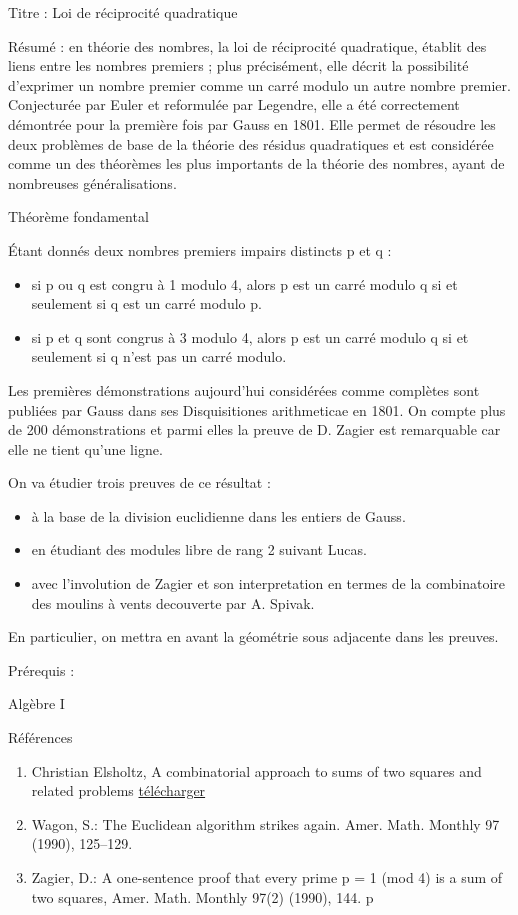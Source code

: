Titre : Loi de réciprocité quadratique

Résumé : en théorie des nombres, la loi de réciprocité quadratique,
établit des liens entre les nombres premiers ; plus précisément, elle
décrit la possibilité d'exprimer un nombre premier comme un carré modulo
un autre nombre premier. Conjecturée par Euler et reformulée par
Legendre, elle a été correctement démontrée pour la première fois par
Gauss en 1801. Elle permet de résoudre les deux problèmes de base de la
théorie des résidus quadratiques et est considérée comme un des
théorèmes les plus importants de la théorie des nombres, ayant de
nombreuses généralisations.

Théorème fondamental

Étant donnés deux nombres premiers impairs distincts p et q :

\begin{itemize}
\tightlist
\item
  si p ou q est congru à 1 modulo 4, alors p est un carré modulo q si et
  seulement si q est un carré modulo p.
\item
  si p et q sont congrus à 3 modulo 4, alors p est un carré modulo q si
  et seulement si q n'est pas un carré modulo.
\end{itemize}

Les premières démonstrations aujourd'hui considérées comme complètes
sont publiées par Gauss dans ses Disquisitiones arithmeticae en 1801. On
compte plus de 200 démonstrations et parmi elles la preuve de D. Zagier
est remarquable car elle ne tient qu'une ligne.

On va étudier trois preuves de ce résultat :

\begin{itemize}
\tightlist
\item
  à la base de la division euclidienne dans les entiers de Gauss.
\item
  en étudiant des modules libre de rang 2 suivant Lucas.
\item
  avec l'involution de Zagier et son interpretation en termes de la
  combinatoire des moulins à vents decouverte par A. Spivak.
\end{itemize}

En particulier, on mettra en avant la géométrie sous adjacente dans les
preuves.

Prérequis :

Algèbre I

Références

\begin{enumerate}
\def\labelenumi{\arabic{enumi}.}
\item
  Christian Elsholtz, A combinatorial approach to sums of two squares
  and related problems
  \href{https://www.math.tugraz.at/~elsholtz/WWW/papers/papers30nathanson-new-address3.pdf}{télécharger}
\item
  Wagon, S.: The Euclidean algorithm strikes again. Amer. Math. Monthly
  97 (1990), 125--129.
\item
  Zagier, D.: A one-sentence proof that every prime p = 1 (mod 4) is a
  sum of two squares, Amer. Math. Monthly 97(2) (1990), 144. p
\end{enumerate}

